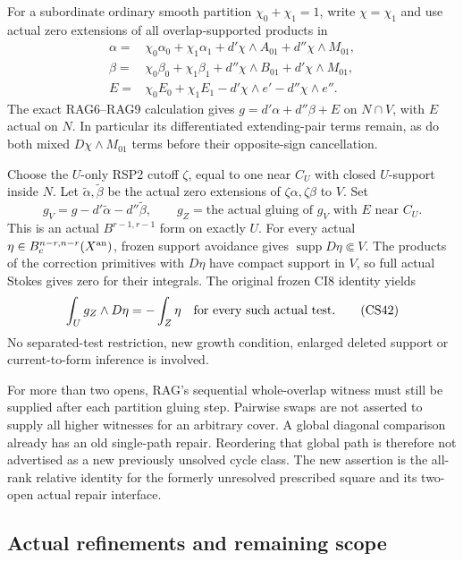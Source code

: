 For a subordinate ordinary smooth partition $\chi_0+\chi_1=1$,
write $\chi=\chi_1$ and use actual zero extensions of all
overlap-supported products in
\[
 \begin{split}
 \alpha={}&\chi_0\alpha_0+\chi_1\alpha_1
                  +d'\chi\wedge A_{01}+d''\chi\wedge M_{01},\\
 \beta={}&\chi_0\beta_0+\chi_1\beta_1
                  +d''\chi\wedge B_{01}+d'\chi\wedge M_{01},\\
 E={}&\chi_0E_0+\chi_1E_1
                             -d'\chi\wedge e'-d''\chi\wedge e''.
 \end{split}
 \tag{CS40}
\]
The exact RAG6--RAG9 calculation gives
$g=d'\alpha+d''\beta+E$ on $N\cap V$, with $E$ actual on $N$.
In particular its differentiated extending-pair terms remain,
as do both mixed $D\chi\wedge M_{01}$ terms before their
opposite-sign cancellation.

Choose the $U$-only RSP2 cutoff $\zeta$, equal to one near
$C_U$ with closed $U$-support inside $N$.  Let
$\widetilde\alpha,\widetilde\beta$ be the actual zero extensions
of $\zeta\alpha,\zeta\beta$ to $V$.  Set
\[
 g_V=g-d'\widetilde\alpha-d''\widetilde\beta,\qquad
 g_Z=\text{the actual gluing of $g_V$ with $E$ near $C_U$}.
 \tag{CS41}
\]
This is an actual $B^{r-1,r-1}$ form on exactly $U$.
For every actual $\eta\in B_c^{n-r,n-r}(X^{\rm an})$, frozen
support avoidance gives $\operatorname{supp}D\eta\Subset V$.
The products of the correction primitives with $D\eta$ have
compact support in $V$, so full actual Stokes gives zero for
their integrals.  The original frozen CI8 identity yields
\[
                       \int_Ug_Z\wedge D\eta=-\int_Z\eta
                              \quad\hbox{for every such actual test}.
 \tag{CS42}
\]
No separated-test restriction, new growth condition, enlarged
deleted support or current-to-form inference is involved.

For more than two opens, RAG's sequential whole-overlap witness
must still be supplied after each partition gluing step.
Pairwise swaps are not asserted to supply all higher witnesses
for an arbitrary cover.  A global diagonal comparison already
has an old single-path repair.  Reordering that global path is
therefore not advertised as a new previously unsolved cycle
class.  The new assertion is the all-rank relative identity for
the formerly unresolved prescribed square and its two-open
actual repair interface.

\subsection{Actual refinements and remaining scope}

